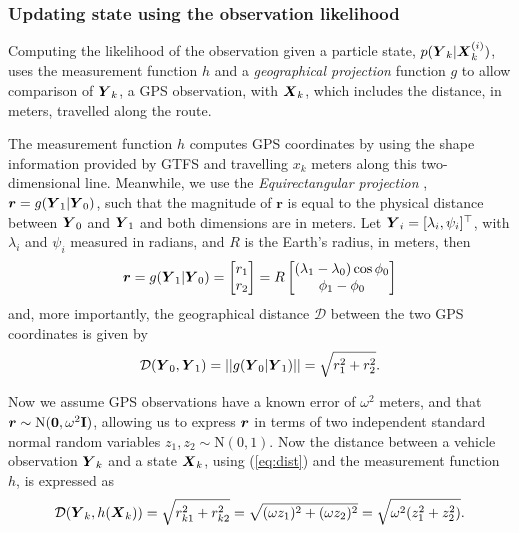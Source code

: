 \subsubsection{Updating state using the observation likelihood}
\label{sec:pf_update}

Computing the likelihood of the observation given a particle state,
$p(\mbox{$\boldsymbol{Y}$}_k|\mbox{$\boldsymbol{X}$}_k^{(i)})$,
uses the measurement function $h$ and 
a \emph{geographical projection} function $g$ to allow comparison of $\mbox{$\boldsymbol{Y}$}_k$,
a GPS observation, with $\mbox{$\boldsymbol{X}$}_k$, 
which includes the distance, in meters, travelled along the route.

The measurement function $h$ computes GPS coordinates by using the 
shape information provided by GTFS and travelling $x_k$ meters along 
this two-dimensional line.
Meanwhile, we use the \emph{Equirectangular projection} \citep{Snyder_1998},
$\boldsymbol{r} = g(\mbox{$\boldsymbol{Y}$}_1 | \mbox{$\boldsymbol{Y}$}_0)$,
such that the magnitude of $\boldsymbol{r}$ is equal to the physical distance
between $\mbox{$\boldsymbol{Y}$}_0$ and $\mbox{$\boldsymbol{Y}$}_1$ and both dimensions are in meters.
Let $\mbox{$\boldsymbol{Y}$}_i = [\lambda_i, \psi_i]^\top$,
with $\lambda_i$ and $\psi_i$ measured in radians,  
and $R$ is the Earth's radius, in meters, then
\begin{equation*}
\boldsymbol{r} = 
g(\mbox{$\boldsymbol{Y}$}_1 | \mbox{$\boldsymbol{Y}$}_0) = 
    \begin{bmatrix}
        r_1 \\ r_2
    \end{bmatrix} =
    R \begin{bmatrix}
        (\lambda_1 - \lambda_0)\cos\phi_0 \\
        \phi_1 - \phi_0
    \end{bmatrix}
\end{equation*}
and, more importantly, the geographical distance $\mathcal{D}$ between the two 
GPS coordinates is given by
\begin{equation}
\label{eq:dist}
\mathcal{D}(\mbox{$\boldsymbol{Y}$}_0, \mbox{$\boldsymbol{Y}$}_1) = ||g(\mbox{$\boldsymbol{Y}$}_0 | \mbox{$\boldsymbol{Y}$}_1)|| = \sqrt{r_1^2 + r_2^2}.
\end{equation}


Now we assume GPS observations have a known error of $\omega^2$ meters,
and that \mbox{$\boldsymbol{r} \sim \mathrm{N}(\boldsymbol{0}, \omega^2\mathbf{I})$},
allowing us to express $\boldsymbol{r}$ in terms of two independent
standard normal random variables $z_1, z_2 \sim \mathrm{N}(0,1)$.
Now the distance between a vehicle observation $\mbox{$\boldsymbol{Y}$}_k$
and a state $\mbox{$\boldsymbol{X}$}_k$, using (\ref{eq:dist}) and the measurement function $h$,
is expressed as
\begin{equation}
\label{eq:obs_dist}
\mathcal{D}(\mbox{$\boldsymbol{Y}$}_k, h(\mbox{$\boldsymbol{X}$}_k)) = \sqrt{r_{k1}^2 + r_{k2}^2} 
    = \sqrt{(\omega z_1)^2 + (\omega z_2)^2}
    = \sqrt{\omega^2 (z_1^2 + z_2^2)}.
\end{equation}

